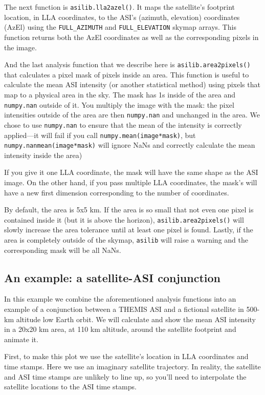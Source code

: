 \documentclass[draft]{agujournal2019}
\begin{document}
The next function is \verb|asilib.lla2azel()|. It maps the satellite's footprint location, in LLA coordinates, to the ASI's (azimuth, elevation) coordinates (AzEl) using the \verb|FULL_AZIMUTH| and \verb|FULL_ELEVATION| skymap arrays. This function returns both the AzEl coordinates as well as the corresponding pixels in the image.

And the last analysis function that we describe here is \verb|asilib.area2pixels()| that calculates a pixel mask of pixels inside an area. This function is useful to calculate the mean ASI intensity (or another statistical method) using pixels that map to a physical area in the sky. The mask has 1s inside of the area and \verb|numpy.nan| outside of it. You multiply the image with the mask: the pixel intensities outside of the area are then \verb|numpy.nan| and unchanged in the area. We chose to use \verb|numpy.nan| to ensure that the mean of the intensity is correctly applied---it will fail if you call \verb|numpy.mean(image*mask)|, but \verb|numpy.nanmean(image*mask)| will ignore NaNs and correctly calculate the mean intensity inside the area)

If you give it one LLA coordinate, the mask will have the same shape as the ASI image. On the other hand, if you pass multiple LLA coordinates, the mask's will have a new first dimension corresponding to the number of coordinates.

By default, the area is 5x5 km. If the area is so small that not even one pixel is contained inside it (but it is above the horizon), \verb|asilib.area2pixels()| will slowly increase the area tolerance until at least one pixel is found. Lastly, if the area is completely outside of the skymap, \verb|asilib| will raise a warning and the corresponding mask will be all NaNs. 

\subsection{An example: a satellite-ASI conjunction}\label{satellite_conjunction}
In this example we combine the aforementioned analysis functions into an example of a conjunction between a THEMIS ASI and a fictional satellite in 500-km altitude low Earth orbit. We will calculate and show the mean ASI intensity in a 20x20 km area, at 110 km altitude, around the satellite footprint and animate it.

First, to make this plot we use the satellite's location in LLA coordinates and time stamps. Here we use an imaginary satellite trajectory. In reality, the satellite and ASI time stamps are unlikely to line up, so you'll need to interpolate the satellite locations to the ASI time stamps.
\end{document}
